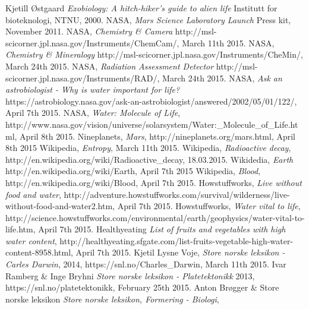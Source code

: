 \begin{thebibliography}{99}	%
		Kjetill Østgaard
		\emph{Exobiology: A hitch-hiker's guide to alien life}
		Institutt for bioteknologi,
		NTNU,
		2000.
		NASA,
		\emph{Mars Science Laboratory Launch}
		Press kit,
		November 2011.
		NASA,
		\emph{Chemistry \& Camera}
		http://msl-scicorner.jpl.nasa.gov/Instruments/ChemCam/,
		March 11th 2015.
		NASA,
		\emph{Chemistry \& Mineralogy}
		http://msl-scicorner.jpl.nasa.gov/Instruments/CheMin/,
		March 24th 2015.
		NASA,
		\emph{Radiation Assessment Detector}
		http://msl-scicorner.jpl.nasa.gov/Instruments/RAD/,
		March 24th 2015.
		NASA,
		\emph{Ask an astrobiologist - Why is water important for life?}
		https://astrobiology.nasa.gov/ask-an-astrobiologist/answered/2002/05/01/122/,
		April 7th 2015.
		NASA,
		\emph{Water: Molecule of Life},
		http://www.nasa.gov/vision/universe/solarsystem/Water:\_Molecule\_of\_Life.html,
		April 8th 2015.
		Nineplanets,
		\emph{Mars},
		http://nineplanets.org/mars.html,
		April 8th 2015
		Wikipedia,
		\emph{Entropy},
		March 11th 2015.
		Wikipedia,
		\emph{Radioactive decay},
		http://en.wikipedia.org/wiki/Radioactive\_decay,
		18.03.2015.
		Wikidedia,
		\emph{Earth}
		http://en.wikipedia.org/wiki/Earth,
		April 7th 2015
		Wikipedia,
		\emph{Blood},
		http://en.wikipedia.org/wiki/Blood,
		April 7th 2015.
		Howstuffworks,
		\emph{Live without food and water},
		http://adventure.howstuffworks.com/survival/wilderness/live-without-food-and-water2.htm,
		April 7th 2015.
		Howstuffworks,
		\emph{Water vital to life},
		http://science.howstuffworks.com/environmental/earth/geophysics/water-vital-to-life.htm,
		April 7th 2015.
		Healthyeating
		\emph{List of fruits and vegetables with high water content},
		http://healthyeating.sfgate.com/list-fruits-vegetable-high-water-content-8958.html,
		April 7th 2015.
		Kjetil Lysne Voje,
		\emph{Store norske leksikon - Carles Darwin},
		2014,
		https://snl.no/Charles\_Darwin,
		March 11th 2015.
		Ivar Ramberg \& Inge Bryhni
		\emph{Store norske leksikon - Platetektonikk}
		2013,
		https://snl.no/platetektonikk,
		February 25th 2015.
		Anton Brøgger \& Store norske leksikon
		\emph{Store norske leksikon, Formering - Biologi},

\end{thebibliography}
